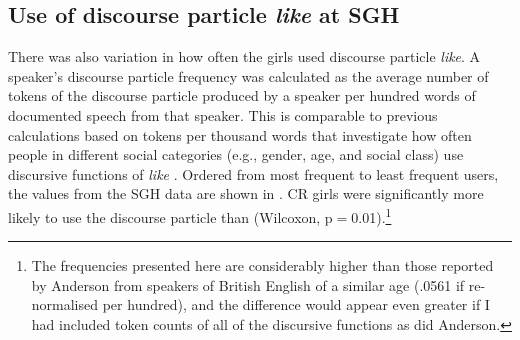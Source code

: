 





\subsection{Use of discourse particle \textit{like} at SGH}\label{section:dplike}

There was also variation in how often the girls used discourse particle \textit{like}. A speaker's discourse particle frequency was calculated as the average number of tokens of the discourse particle produced by a speaker per hundred words of documented speech from that speaker. This is comparable to previous calculations based on tokens per thousand words that investigate how often people in different social categories (e.g., gender, age, and social class) use discursive functions of \textit{like} \citep[287-299]{anderson2001}. Ordered from most frequent to least frequent users, the values from the SGH data are shown in . CR girls were significantly more likely to use the discourse particle than  (Wilcoxon, p$=$0.01).\footnote{The frequencies presented here are considerably higher than those reported by Anderson from speakers of British English of a similar age (.0561 if re-normalised per hundred), and the difference would appear even greater if I had included token counts of all of the discursive functions as did Anderson.} 



